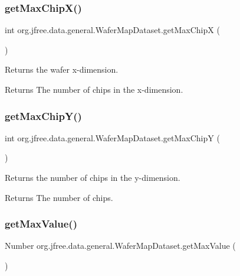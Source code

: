 \subsubsection{\texorpdfstring{get\+Max\+Chip\+X()}{getMaxChipX()}}
{\footnotesize\ttfamily int org.\+jfree.\+data.\+general.\+Wafer\+Map\+Dataset.\+get\+Max\+ChipX (\begin{DoxyParamCaption}{ }\end{DoxyParamCaption})}

Returns the wafer x-\/dimension.

\begin{DoxyReturn}{Returns}
The number of chips in the x-\/dimension. 
\end{DoxyReturn}
\mbox{\label{classorg_1_1jfree_1_1data_1_1general_1_1_wafer_map_dataset_acff8ffd529d727b419b078d52ed1b96f}} 
\subsubsection{\texorpdfstring{get\+Max\+Chip\+Y()}{getMaxChipY()}}
{\footnotesize\ttfamily int org.\+jfree.\+data.\+general.\+Wafer\+Map\+Dataset.\+get\+Max\+ChipY (\begin{DoxyParamCaption}{ }\end{DoxyParamCaption})}

Returns the number of chips in the y-\/dimension.

\begin{DoxyReturn}{Returns}
The number of chips. 
\end{DoxyReturn}
\mbox{\label{classorg_1_1jfree_1_1data_1_1general_1_1_wafer_map_dataset_a1d7b8a2b9c25b22d479d5891da77bfa0}} 
\subsubsection{\texorpdfstring{get\+Max\+Value()}{getMaxValue()}}
{\footnotesize\ttfamily Number org.\+jfree.\+data.\+general.\+Wafer\+Map\+Dataset.\+get\+Max\+Value (\begin{DoxyParamCaption}{ }\end{DoxyParamCaption})}

